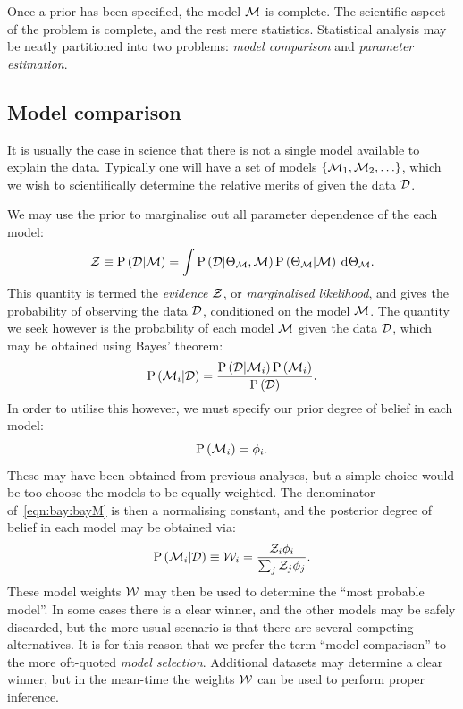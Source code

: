 Once a prior has been specified, the model $\mathcal{M}$ is complete. The scientific aspect of the problem is complete, and the rest mere statistics. Statistical analysis may be neatly partitioned into two problems: {\em model comparison\/} and {\em parameter estimation}.

\subsection{Model comparison}
It is usually the case in science that there is not a single model available to explain the data. Typically one will have a set of models ${\{\mathcal{M}_1,\mathcal{M}_2,\ldots\}}$, which we wish to scientifically determine the relative merits of given the data $\mathcal{D}$.

We may use the prior to marginalise out all parameter dependence of the each model:
\begin{equation}
  \mathcal{Z}\equiv\mathrm{P}\left(\mathcal{D}\middle|\mathcal{M}\right) 
  =
  \int  \mathrm{P}\left(\mathcal{D}\middle|\Theta_{\mathcal{M}},\mathcal{M}\right)\mathrm{P}\left(\Theta_{\mathcal{M}}\middle|\mathcal{M}\right)\:\operatorname{d}^{}\!{\Theta_{\mathcal{M}}}.
  \label{eqn:bay:ev_def}
\end{equation}
This quantity is termed the {\em evidence\/} $\mathcal{Z}$, or {\em marginalised likelihood}, and gives the probability of observing the data $\mathcal{D}$, conditioned on the model $\mathcal{M}$. The quantity we seek however is the probability of each model $\mathcal{M}$ given the data $\mathcal{D}$, which may be obtained using Bayes' theorem:
\begin{equation}
  \mathrm{P}\left(\mathcal{M}_i\middle|\mathcal{D}\right) = \frac{\mathrm{P}\left(\mathcal{D}\middle|\mathcal{M}_i\right)\mathrm{P}\left(\mathcal{M}_i\right)}{\mathrm{P}\left(\mathcal{D}\right)}.
  \label{eqn:bay:bayM}
\end{equation}
In order to utilise this however, we must specify our prior degree of belief in each model:
\begin{equation}
  \mathrm{P}\left(\mathcal{M}_i\right) = \phi_i.
\end{equation}
These may have been obtained from previous analyses, but a simple choice would be too choose the models to be equally weighted. The denominator of~\eqref{eqn:bay:bayM} is then a normalising constant, and the posterior degree of belief in each model may be obtained via:
\begin{equation}
  \mathrm{P}\left(\mathcal{M}_i\middle|\mathcal{D}\right) 
  \equiv
  \mathcal{W}_i
  =
  \frac{\mathcal{Z}_i\phi_i}{\sum_j \mathcal{Z}_j\phi_j}.
\end{equation}
These model weights $\mathcal{W}$ may then be used to determine the ``most probable model''. In some cases there is a clear winner, and the other models may be safely discarded, but the more usual scenario is that there are several competing alternatives. It is for this reason that we prefer the term ``model comparison'' to the more oft-quoted {\em model selection}. Additional datasets may determine a clear winner, but in the mean-time the weights $\mathcal{W}$ can be used to perform proper inference. 

